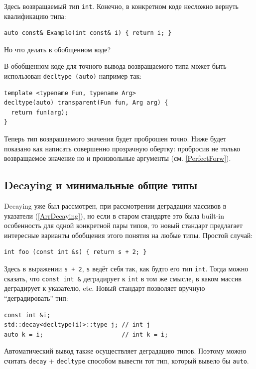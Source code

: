 \documentclass[a4paper,12pt,oneside]{book}
\begin{document}
Здесь возвращаемый тип \lstinline!int!. Конечно, в конкретном коде несложно вернуть квалификацию типа:

\begin{lstlisting}
auto const& Example(int const& i) { return i; }
\end{lstlisting}

Но что делать в обобщенном коде?

В обобщенном коде для точного вывода возвращаемого типа может быть использован \lstinline!decltype (auto)! например так:

\begin{lstlisting}
template <typename Fun, typename Arg>
decltype(auto) transparent(Fun fun, Arg arg) { 
  return fun(arg); 
}
\end{lstlisting}

Теперь тип возвращаемого значения будет проброшен точно. Ниже будет показано как написать совершенно прозрачную обертку: пробросив не только возвращаемое значение но и произвольные аргументы (см. \ref{PerfectForw}).

\subsection{Decaying и минимальные общие типы}\label{Decaying}

Decaying уже был рассмотрен, при рассмотрении деградации массивов в указатели (\ref{ArrDecaying}), но если в старом стандарте это была built-in особенность для одной конкретной пары типов, то новый стандарт предлагает интересные варианты обобщения этого понятия на любые типы. Простой случай:

\begin{lstlisting}
int foo (const int &s) { return s + 2; }
\end{lstlisting}

Здесь в выражении \lstinline!s + 2!, \lstinline!s! ведёт себя так, как будто его тип \lstinline!int!. Тогда можно сказать, что \lstinline!const int &! деградирует к \lstinline!int! в том же смысле, в каком массив деградирует к указателю, etc. Новый стандарт позволяет вручную ``деградировать'' тип:

\begin{lstlisting}
const int &i;
std::decay<decltype(i)>::type j; // int j 
auto k = i;                      // int k = i;
\end{lstlisting}

Автоматический вывод также осуществляет деградацию типов. Поэтому можно считать \lstinline!decay! + \lstinline!decltype! способом вывести тот тип, который вывело бы \lstinline!auto!.
\end{document}
